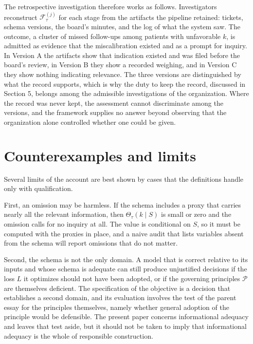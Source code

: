 \documentclass[11pt]{article}
\newcommand{\F}{\mathcal F}
\newcommand{\Th}{\Theta}
\theoremstyle{plain}
\theoremstyle{definition}
\begin{document}
The retrospective investigation therefore works as follows. Investigators reconstruct $\F^{(j)}_\tau$ for each stage from the artifacts the pipeline retained: tickets, schema versions, the board's minutes, and the log of what the system saw. The outcome, a cluster of missed follow-ups among patients with unfavorable $k$, is admitted as evidence that the miscalibration existed and as a prompt for inquiry. In Version A the artifacts show that indication existed and was filed before the board's review, in Version B they show a recorded weighing, and in Version C they show nothing indicating relevance. The three versions are distinguished by what the record supports, which is why the duty to keep the record, discussed in Section 5, belongs among the admissible investigations of the organization. Where the record was never kept, the assessment cannot discriminate among the versions, and the framework supplies no answer beyond observing that the organization alone controlled whether one could be given.

\section{Counterexamples and limits}

Several limits of the account are best shown by cases that the definitions handle only with qualification.

First, an omission may be harmless. If the schema includes a proxy that carries nearly all the relevant information, then $\Th_\tau(k\mid S)$ is small or zero and the omission calls for no inquiry at all. The value is conditional on $S$, so it must be computed with the proxies in place, and a naive audit that lists variables absent from the schema will report omissions that do not matter.

Second, the schema is not the only domain. A model that is correct relative to its inputs and whose schema is adequate can still produce unjustified decisions if the loss $L$ it optimizes should not have been adopted, or if the governing principles $\mathcal P$ are themselves deficient. The specification of the objective is a decision that establishes a second domain, and its evaluation involves the test of the parent essay for the principles themselves, namely whether general adoption of the principle would be defensible. The present paper concerns informational adequacy and leaves that test aside, but it should not be taken to imply that informational adequacy is the whole of responsible construction.
\end{document}
